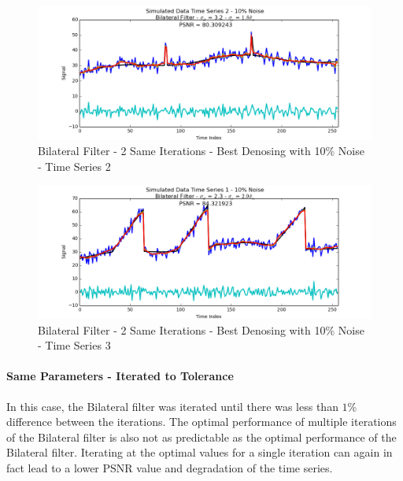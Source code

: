 \documentclass[11pt]{article}
\theoremstyle{definition}
\begin{document}
\begin{figure}
\centering
\includegraphics[width = 0.75 \textwidth]{2SameBilateralSignal2Best.png}
\caption{Bilateral Filter - 2 Same Iterations - Best Denosing with 10\% Noise - Time Series 2}
\label{2samebilateral2best}
\end{figure}

\begin{figure}
\centering
\includegraphics[width = 0.75 \textwidth]{2SameBilateralSignal3Best.png}
\caption{Bilateral Filter - 2 Same Iterations - Best Denosing with 10\% Noise - Time Series 3}
\label{2samebilateral3best}
\end{figure}

\newpage

\paragraph{Same Parameters - Iterated to Tolerance}

In this case, the Bilateral filter was iterated until there was less than $1$\% difference between the iterations. The optimal performance of multiple iterations of the Bilateral filter is also not as predictable as the optimal performance of the Bilateral filter. Iterating at the optimal values for a single iteration can again in fact lead to a lower PSNR value and degradation of the time series.
\end{document}

